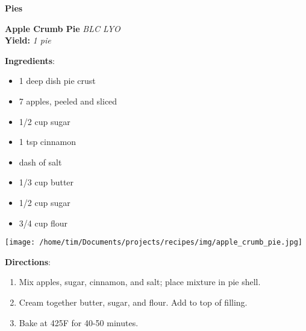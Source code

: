 \documentclass[11pt, twoside, openany]{book}
\begin{document}
{\newpage \LARGE \textbf{Pies}} \label{pies}\vspace{4mm}\\
\noindent\begin{minipage}[t]{\linewidth}%
{\Large\textbf{Apple Crumb Pie}} \label{apple-crumb-pie}\hfill\textit{BLC LYO}\\
\textbf{Yield:} \textit{1 pie}\\
\noindent\begin{minipage}[t]{0.78\linewidth}%
\textbf{Ingredients}:\vspace{-3mm}
\begin{multicols}{2}
\begin{itemize}\setlength\itemsep{-1mm}
\item 1 deep dish pie crust
\item 7 apples, peeled and sliced
\item 1/2 cup sugar
\item 1 tsp cinnamon
\item dash of salt
\item 1/3 cup butter
\item 1/2 cup sugar
\item 3/4 cup flour
\end{itemize}
\end{multicols}
\end{minipage}
\noindent\begin{minipage}[t]{0.18\linewidth}
\centering \strut\vspace*{-\baselineskip}\newline
\texttt{[image: /home/tim/Documents/projects/recipes/img/apple\_crumb\_pie.jpg]}\\
\end{minipage}\vspace{3mm}
\textbf{Directions}:
\vspace{-3mm}\begin{enumerate}\setlength\itemsep{-1mm}
\item Mix apples, sugar, cinnamon, and salt; place mixture in pie shell.
\item Cream together butter, sugar, and flour. Add to top of filling.
\item Bake at 425F for 40-50 minutes.
\end{enumerate}
\end{minipage}\vspace{8mm}
\end{document}
